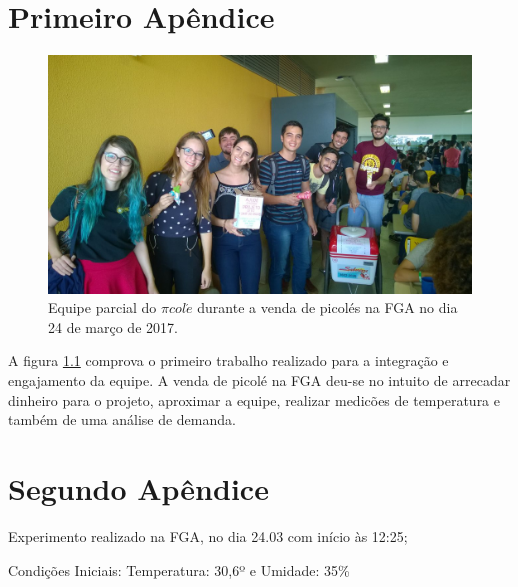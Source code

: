 \begin{apendicesenv}

\partapendices

\chapter{Primeiro Apêndice}
\label{app:pessoas}
\begin{figure}[H]
	\centering
    \includegraphics[scale=0.5]{figuras/pessoas}
    \caption{Equipe parcial do $\pi col\acute{e}$ durante a venda de picolés na FGA no dia 24 de março de 2017. }
    \label{fig:fotopessoas}
\end{figure}

A figura \ref{fig:fotopessoas} comprova o primeiro trabalho realizado para a integração e engajamento da equipe. A venda de picolé na FGA deu-se no intuito de arrecadar dinheiro para o projeto, aproximar a equipe, realizar medicões de temperatura e também de uma análise de demanda.

\chapter{Segundo Apêndice}

	Experimento realizado na FGA, no dia 24.03 com início às 12:25;

Condições Iniciais:
     	Temperatura: 30,6º e
     	Umidade: 35\%
        

\end{apendicesenv}
